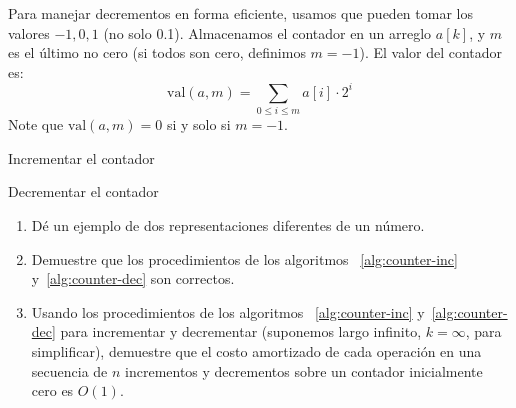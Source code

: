 \begin{enumerate}
  Para manejar decrementos en forma eficiente,
  usamos  que pueden tomar los valores \(-1, 0, 1\)
  (no solo \num{0, 1}).
  Almacenamos el contador en un arreglo \(a[k]\),
  y \(m\) es el último  no cero
  (si todos son cero, definimos \(m = -1\)).
  El valor del contador es:
  \begin{equation*}
    \mathrm{val}(a, m)
      = \sum_{0 \le i \le m} a[i] \cdot 2^i
  \end{equation*}
  Note que \(\mathrm{val}(a, m) = 0\) si y solo si \(m = -1\).
  \begin{algorithm}[ht]
    \DontPrintSemicolon\Indp

    \caption{Incrementar el contador}
    \label{alg:counter-inc}
  \end{algorithm}
  \begin{algorithm}[ht]
    \DontPrintSemicolon\Indp

    \caption{Decrementar el contador}
    \label{alg:counter-dec}
  \end{algorithm}
  \begin{enumerate}
  \item
    Dé un ejemplo de dos representaciones diferentes de un número.
  \item
    Demuestre que los procedimientos de los algoritmos~%
    \ref{alg:counter-inc} y~\ref{alg:counter-dec}
    son correctos.
  \item
    Usando los procedimientos de los algoritmos~%
    \ref{alg:counter-inc} y~\ref{alg:counter-dec}
    para incrementar y decrementar
    (suponemos largo infinito, \(k = \infty\), para simplificar),
    demuestre que el costo amortizado de cada operación
    en una secuencia de \(n\) incrementos y decrementos
    sobre un contador inicialmente cero es \(O(1)\).
  \end{enumerate}
\end{enumerate}




